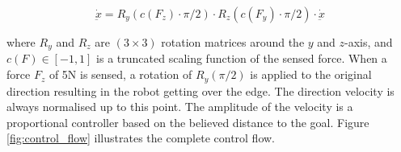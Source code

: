 \documentclass[final,5p,times,twocolumn]{elsarticle}
\newcommand{\Param}{\boldsymbol{\theta}}
\begin{document}
\begin{equation}
  \dot{\underbar{x}} = R_y(c(F_z) \cdot \pi/2) \cdot R_z(c(F_y) \cdot \pi/2) \cdot \dot{\underbar{x}} \label{eq:modulation}
\end{equation}

where $R_y$ and $R_z$ are $(3 \times 3)$ rotation matrices around the $y$ and $z$-axis, and $c(F) \in [-1,1]$ is a truncated scaling function of the sensed 
force.  When a force $F_z$ of 5N is sensed, a rotation of $R_y(\pi/2)$ is applied to the original direction resulting in the robot
getting over the edge. The direction velocity is always normalised up to this point. The amplitude of the velocity is a proportional
controller based on the believed distance to the goal. Figure \ref{fig:control_flow} illustrates the complete control flow.



\end{document}
